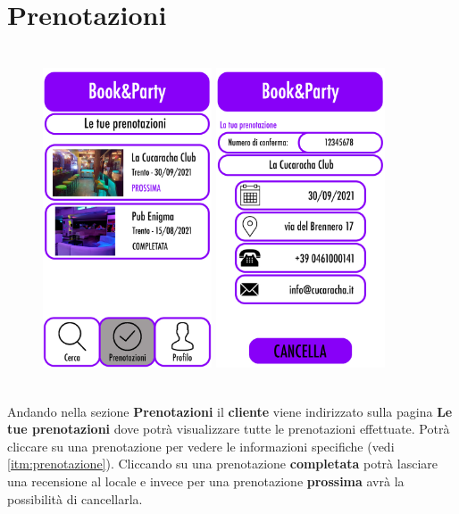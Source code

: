 \newpage
\section{Prenotazioni}
\begin{figure}[h]
    \centering
    \includegraphics[width=5cm, height=10cm]{mockup/07-prenotazioni.jpg}
    \qquad\qquad
    \includegraphics[width=5cm, height=10cm]{mockup/08-riepilogo-prenotazione.jpg}
    \label{fig:prenota}
\end{figure}

Andando nella sezione \textbf{Prenotazioni} il \textbf{cliente} viene indirizzato sulla pagina
\textbf{Le tue prenotazioni} dove potrà visualizzare tutte le prenotazioni effettuate. Potrà 
cliccare su una prenotazione per vedere le informazioni specifiche (vedi \ref{itm:prenotazione}). 
Cliccando su una prenotazione \textbf{completata} potrà lasciare una recensione al locale e invece 
per una prenotazione \textbf{prossima} avrà la possibilità di cancellarla.


